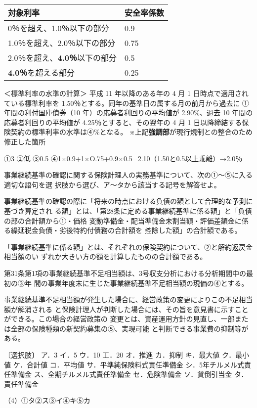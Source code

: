 \documentclass[report,gutter=10mm,fore-edge=10mm,uplatex,dvipdfmx]{jlreq}
\begin{document}
\begin{longtable}[]{@{}ll@{}}
\toprule
対象利率 & 安全率係数\tabularnewline
\midrule
\endhead
0％を超え、1.0％以下の部分 & 0.9\tabularnewline
1.0％を超え、2.0％以下の部分 & 0.75\tabularnewline
2.0％を超え、\textbf{4.0％}以下の部分 & 0.5\tabularnewline
\textbf{4.0％}を超える部分 & 0.25\tabularnewline
\bottomrule
\end{longtable}

＜標準利率の水準の計算＞ 平成 11 年以降のある年の 4 月 1
日時点で適用されている標準利率を
1.50％とする。同年の基準日の属する月の前月から過去に
①年間の利付国庫債券（10 年）の応募者利回りの平均値が 2.90\%、過去 10
年間の応募者利回りの平均値が 4.25％とすると、その翌年の 4 月 1
日以降締結する保険契約の標準利率の水準は④\%となる。
※上記\textbf{強調部}が現行規制との整合のため修正した箇所


①3 ②低 ③0.5 ④1×0.9+1×O.75+0.9×0.5=2.10（1.50と0.5以上乖離）→2.0％

事業継続基準の確認に関する保険計理人の実務基準について、次の①〜⑤に入る適切な語句を選
択肢から選び、ア〜タから該当する記号を解答せよ。

事業継続基準の確認の際に「将来の時点における負債の額として合理的な予測に基づき算定され
る額」とは、「第28条に定める事業継続基準に係る額」と「負債の部の合計額から①・価格
変動準備金・配当準備金未割当額・評価差額金に係る繰延税金負債・劣後特約付債務の合計額を
控除した額」の合計額である。

「事業継続基準に係る額」とは、それぞれの保険契約について、②と解約返戻金相当額のい
ずれか大きい方の額を計算したものの合計額である。

第31条第1項の事業継続基準不足相当額は、3号収支分析における分析期間中の最初の③年
間の事業年度末に生じた事業継続基準不足相当額の現価の④とする。

事業継続基準不足相当額が発生した場合に、経営政策の変更によりこの不足相当額が解消される
と保険計理人が判断した場合には、その旨を意見書に示すことができる。この場合の経営政策の
変更とは、資産運用方針の見直し、一部または全部の保険種類の新契約募集の⑤、実現可能
と判断できる事業費の抑制等がある。

〔選択肢〕
ア．3
イ．5
ウ．10
工．20
オ．推進
カ．抑制
キ．最大値
ク．最小値
ケ．合計値
コ．平均値
サ．平準純保険料式責任準備金
シ．5年チルメル式責任準備金
ス、全期チルメル式責任準備金
セ．危険準備金
ソ．貸倒引当金
タ．責任準備金

\answer{}
（4）①タ②ス③イ④キ⑤カ
\end{document}
